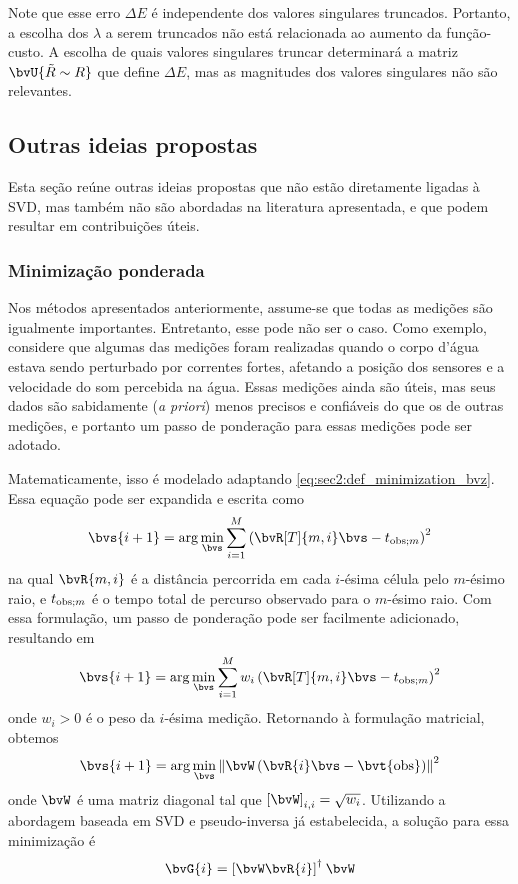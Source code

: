 Note que esse erro $\Delta E$ é independente dos valores singulares truncados. Portanto, a escolha dos $\lambda$ a serem truncados não está relacionada ao aumento da função-custo. A escolha de quais valores singulares truncar determinará a matriz $\bvU{\tilde{R}\sim R}$ que define $\Delta E$, mas as magnitudes dos valores singulares não são relevantes.

\subsection{Outras ideias propostas}

Esta seção reúne outras ideias propostas que não estão diretamente ligadas à SVD, mas também não são abordadas na literatura apresentada, e que podem resultar em contribuições úteis.

\subsubsection{Minimização ponderada}

Nos métodos apresentados anteriormente, assume-se que todas as medições são igualmente importantes. Entretanto, esse pode não ser o caso. Como exemplo, considere que algumas das medições foram realizadas quando o corpo d’água estava sendo perturbado por correntes fortes, afetando a posição dos sensores e a velocidade do som percebida na água. Essas medições ainda são úteis, mas seus dados são sabidamente (\textit{a priori}) menos precisos e confiáveis do que os de outras medições, e portanto um passo de ponderação para essas medições pode ser adotado.

Matematicamente, isso é modelado adaptando \cref{eq:sec2:def_minimization_bvz}. Essa equação pode ser expandida e escrita como
\begin{equation}
	\bvs{i+1} = \arg \min_{\bvs} \sum_{i=1}^{M} \pts{\bvR[T]{m,i} \bvs - t_{\obs;m}}^2
\end{equation}
na qual $\bvR{m,i}$ é a distância percorrida em cada $i$-ésima célula pelo $m$-ésimo raio, e $t_{\operatorname{obs};m}$ é o tempo total de percurso observado para o $m$-ésimo raio. Com essa formulação, um passo de ponderação pode ser facilmente adicionado, resultando em
\begin{equation}
	\bvs{i+1} = \arg \min_{\bvs} \sum_{i=1}^{M} w_i \pts{\bvR[T]{m,i} \bvs - t_{\obs;m}}^2
\end{equation}
onde $w_i > 0$ é o peso da $i$-ésima medição. Retornando à formulação matricial, obtemos
\begin{equation}
	\bvs{i+1} = \arg \min_{\bvs} \norm{\bvW \pts{\bvR{i} \bvs - \bvt{\obs}}}^2
\end{equation}
onde $\bvW$ é uma matriz diagonal tal que $\el{\bvW}[i,i] = \sqrt{w_i}$. Utilizando a abordagem baseada em SVD e pseudo-inversa já estabelecida, a solução para essa minimização é
\begin{equation}
	\bvG{i} = \pinv*{\bvW \bvR{i}} \bvW
	\label{eq:sec3:Gi_weighted_minim}
\end{equation}


